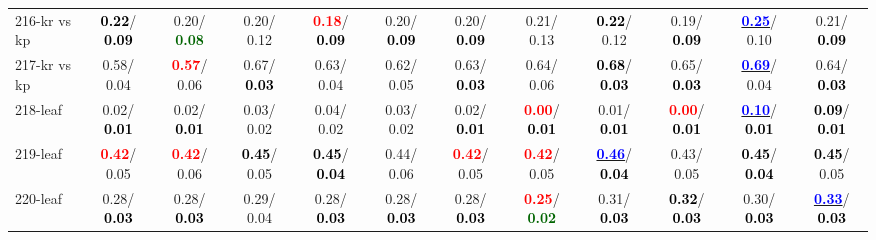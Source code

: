\begin{table}[h]
\begin{center}
{\begin{tabular}{lc|c|c|c|c|c|c|c|c|c|c}
216-kr vs kp & \textcolor{black}{\textbf{  0.22}}/\textcolor{black}{\textbf{  0.09}} &   0.20/\textcolor{darkgreen}{\textbf{  0.08}} &   0.20/  0.12 & \textcolor{red}{\textbf{  0.18}}/\textcolor{black}{\textbf{  0.09}} &   0.20/\textcolor{black}{\textbf{  0.09}} &   0.20/\textcolor{black}{\textbf{  0.09}} &   0.21/  0.13 & \textcolor{black}{\textbf{  0.22}}/  0.12 &   0.19/\textcolor{black}{\textbf{  0.09}} & \underline{\textcolor{blue}{\textbf{  0.25}}}/  0.10 &   0.21/\textcolor{black}{\textbf{  0.09}} \\
217-kr vs kp &   0.58/  0.04 & \textcolor{red}{\textbf{  0.57}}/  0.06 &   0.67/\textcolor{black}{\textbf{  0.03}} &   0.63/  0.04 &   0.62/  0.05 &   0.63/\textcolor{black}{\textbf{  0.03}} &   0.64/  0.06 & \textcolor{black}{\textbf{  0.68}}/\textcolor{black}{\textbf{  0.03}} &   0.65/\textcolor{black}{\textbf{  0.03}} & \underline{\textcolor{blue}{\textbf{  0.69}}}/  0.04 &   0.64/\textcolor{black}{\textbf{  0.03}} \\
218-leaf &   0.02/\textcolor{black}{\textbf{  0.01}} &   0.02/\textcolor{black}{\textbf{  0.01}} &   0.03/  0.02 &   0.04/  0.02 &   0.03/  0.02 &   0.02/\textcolor{black}{\textbf{  0.01}} & \textcolor{red}{\textbf{  0.00}}/\textcolor{black}{\textbf{  0.01}} &   0.01/\textcolor{black}{\textbf{  0.01}} & \textcolor{red}{\textbf{  0.00}}/\textcolor{black}{\textbf{  0.01}} & \underline{\textcolor{blue}{\textbf{  0.10}}}/\textcolor{black}{\textbf{  0.01}} & \textcolor{black}{\textbf{  0.09}}/\textcolor{black}{\textbf{  0.01}} \\
219-leaf & \textcolor{red}{\textbf{  0.42}}/  0.05 & \textcolor{red}{\textbf{  0.42}}/  0.06 & \textcolor{black}{\textbf{  0.45}}/  0.05 & \textcolor{black}{\textbf{  0.45}}/\textcolor{black}{\textbf{  0.04}} &   0.44/  0.06 & \textcolor{red}{\textbf{  0.42}}/  0.05 & \textcolor{red}{\textbf{  0.42}}/  0.05 & \underline{\textcolor{blue}{\textbf{  0.46}}}/\textcolor{black}{\textbf{  0.04}} &   0.43/  0.05 & \textcolor{black}{\textbf{  0.45}}/\textcolor{black}{\textbf{  0.04}} & \textcolor{black}{\textbf{  0.45}}/  0.05 \\
220-leaf &   0.28/\textcolor{black}{\textbf{  0.03}} &   0.28/\textcolor{black}{\textbf{  0.03}} &   0.29/  0.04 &   0.28/\textcolor{black}{\textbf{  0.03}} &   0.28/\textcolor{black}{\textbf{  0.03}} &   0.28/\textcolor{black}{\textbf{  0.03}} & \textcolor{red}{\textbf{  0.25}}/\textcolor{darkgreen}{\textbf{  0.02}} &   0.31/\textcolor{black}{\textbf{  0.03}} & \textcolor{black}{\textbf{  0.32}}/\textcolor{black}{\textbf{  0.03}} &   0.30/\textcolor{black}{\textbf{  0.03}} & \underline{\textcolor{blue}{\textbf{  0.33}}}/\textcolor{black}{\textbf{  0.03}} \\ \hline

\end{tabular}}
\end{center}
\end{table}
